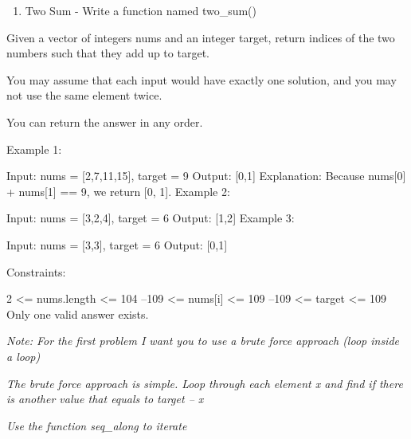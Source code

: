 \documentclass[
]{article}
\providecommand{\tightlist}{%
  \setlength{\itemsep}{0pt}\setlength{\parskip}{0pt}}
\begin{document}
\begin{enumerate}
\def\labelenumi{\arabic{enumi})}
\setcounter{enumi}{4}
\tightlist
\item
  Two Sum - Write a function named two\_sum()
\end{enumerate}

Given a vector of integers nums and an integer target, return indices of
the two numbers such that they add up to target.

You may assume that each input would have exactly one solution, and you
may not use the same element twice.

You can return the answer in any order.

Example 1:

Input: nums = {[}2,7,11,15{]}, target = 9 Output: {[}0,1{]} Explanation:
Because nums{[}0{]} + nums{[}1{]} == 9, we return {[}0, 1{]}. Example 2:

Input: nums = {[}3,2,4{]}, target = 6 Output: {[}1,2{]} Example 3:

Input: nums = {[}3,3{]}, target = 6 Output: {[}0,1{]}

Constraints:

2 \textless= nums.length \textless= 104 --109 \textless= nums{[}i{]}
\textless= 109 --109 \textless= target \textless= 109 Only one valid
answer exists.

\emph{Note: For the first problem I want you to use a brute force
approach (loop inside a loop)}

\emph{The brute force approach is simple. Loop through each element x
and find if there is another value that equals to target -- x}

\emph{Use the function seq\_along to iterate}
\end{document}

